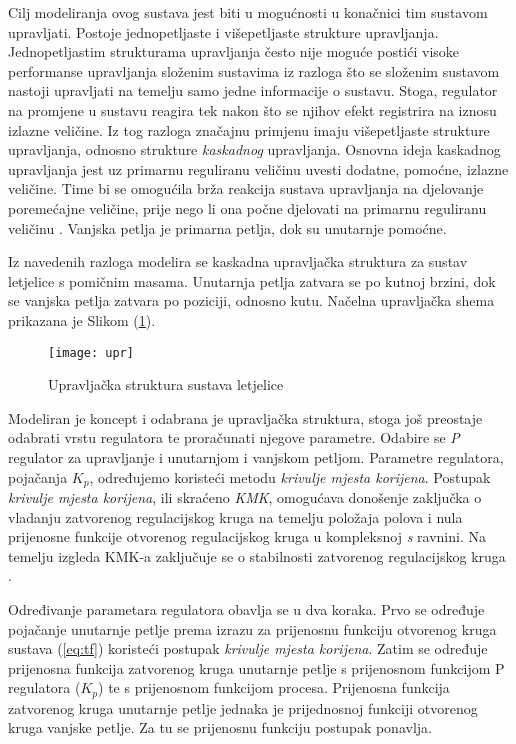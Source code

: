 \documentclass[11pt,a4paper]{article}
\begin{document}
Cilj modeliranja ovog sustava jest biti u mogućnosti u konačnici tim sustavom upravljati. Postoje jednopetljaste i višepetljaste strukture upravljanja. Jednopetljastim strukturama upravljanja često nije moguće postići visoke performanse upravljanja složenim sustavima iz razloga što se složenim sustavom nastoji upravljati na temelju samo jedne informacije o sustavu. Stoga, regulator na promjene u sustavu reagira tek nakon što se njihov efekt registrira na iznosu izlazne veličine. Iz tog razloga značajnu primjenu imaju višepetljaste strukture upravljanja, odnosno strukture \textit{kaskadnog} upravljanja. Osnovna ideja kaskadnog upravljanja jest uz primarnu reguliranu veličinu uvesti dodatne, pomoćne, izlazne veličine. Time bi se omogućila brža reakcija sustava upravljanja na djelovanje poremećajne veličine, prije nego li ona počne djelovati na primarnu reguliranu veličinu \cite{uemp}. Vanjska petlja je primarna petlja, dok su unutarnje pomoćne.   

\medskip

Iz navedenih razloga modelira se kaskadna upravljačka struktura za sustav letjelice s pomičnim masama. Unutarnja petlja zatvara se po kutnoj brzini, dok se vanjska petlja zatvara po poziciji, odnosno kutu. Načelna upravljačka shema prikazana je Slikom (\ref{fig:upr}). 


\begin{figure}[H]
	\centering
	\texttt{[image: upr]}
	\caption{Upravljačka struktura sustava letjelice}
	\label{fig:upr}
\end{figure}

\newpage

Modeliran je koncept i odabrana je upravljačka struktura, stoga još preostaje odabrati vrstu regulatora te proračunati njegove parametre. Odabire se \textit{P} regulator za upravljanje i unutarnjom i vanjskom petljom. Parametre regulatora, pojačanja $K_{p}$, određujemo koristeći metodu \textit{krivulje mjesta korijena}. Postupak \textit{krivulje mjesta korijena}, ili skraćeno \textit{KMK}, omogućava donošenje zaključka o vladanju zatvorenog regulacijskog kruga na temelju položaja polova i nula prijenosne funkcije otvorenog regulacijskog kruga u kompleksnoj \textit{s} ravnini. Na temelju izgleda KMK-a zaključuje se o stabilnosti zatvorenog regulacijskog kruga \cite{mato}. 

\medskip

Određivanje parametara regulatora obavlja se u dva koraka. Prvo se određuje pojačanje unutarnje petlje prema izrazu za prijenosnu funkciju otvorenog kruga sustava (\ref{eq:tf}) koristeći postupak \textit{krivulje mjesta korijena}. Zatim se određuje prijenosna funkcija zatvorenog kruga unutarnje petlje s prijenosnom funkcijom P regulatora ($K_{p}$) te s prijenosnom funkcijom procesa. Prijenosna funkcija zatvorenog  kruga unutarnje petlje jednaka je prijednosnoj funkciji otvorenog kruga vanjske petlje. Za tu se prijenosnu funkciju postupak ponavlja.  
\end{document}
